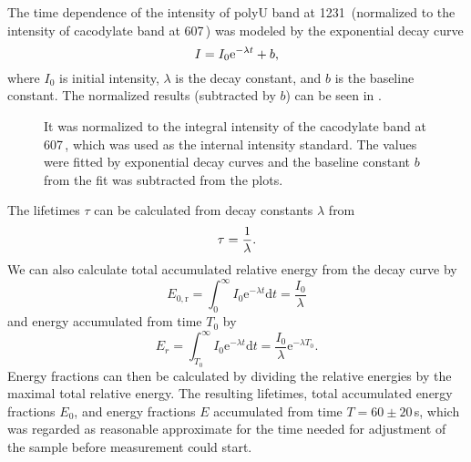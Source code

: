 The time dependence of the intensity of polyU band at 1231\,\icm{} (normalized
to the intensity of cacodylate band at 607\,\icm) was modeled by the
exponential decay curve
\begin{equation}
	I = I_0 \text{e}^{-\lambda t} + b,
	\label{\eqnlabel{power_optim:decay}}
\end{equation}
where $I_0$ is initial intensity, $\lambda$ is the decay constant, and $b$ is
the baseline constant.
The normalized results (subtracted by $b$) can be seen in
.

\begin{figure}
	\centering
	
	\caption[%
		Decrease of the integral intensity of polyU band at 1231\,\icm{} for
		different excitation laser powers in raw spectra.%
	]{%
		It was normalized to the integral intensity of the cacodylate band at
		607\,\icm{}, which was used as the internal intensity standard.
		The values were fitted by exponential decay curves
		and the baseline constant $b$ from the fit was subtracted from the plots.
	}
	\label{\figlabel{power_optim:triplexes}}
\end{figure}

The lifetimes $\tau$ can be calculated from decay constants $\lambda$ from
\begin{equation}
	\tau = \frac{1}{\lambda}.
	\label{\eqnlabel{power_optim:lifetime}}
\end{equation}
We can also calculate total accumulated relative energy from the decay curve
by
\begin{equation*}
	E_{0,\text{r}}
		= \int_0^{\infty}{I_0 \text{e}^{-\lambda t}\text{d}t}
		= \frac{I_0}{\lambda}
\end{equation*}
and energy accumulated from time $T_0$ by
\begin{equation*}
	E_r	= \int_{T_0}^{\infty}{I_0 \text{e}^{-\lambda t}\text{d}t}
		= \frac{I_0}{\lambda} \text{e}^{-\lambda T_0}.
\end{equation*}
Energy fractions can then be calculated by dividing the relative energies by
the maximal total relative energy. The resulting lifetimes, total accumulated
energy fractions $E_0$, and energy fractions $E$ accumulated from time
$T = 60\pm20$\,s, which was regarded as reasonable approximate for the time
needed for adjustment of the sample before measurement could start.

